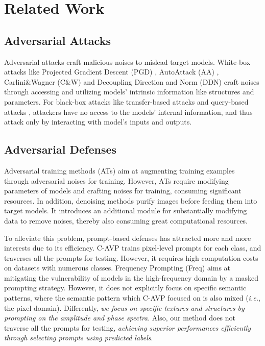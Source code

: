 \section{Related Work}
\subsection{Adversarial Attacks}
Adversarial attacks craft malicious noises to mislead target models. White-box attacks like Projected Gradient Descent (PGD) \cite{madry2017towards}, AutoAttack (AA) \cite{croce2020reliable}, Carlini\&Wagner (C\&W) \cite{carlini2017towards} and Decoupling Direction and Norm (DDN) \cite{rony2019decoupling} craft noises through accessing and utilizing models' intrinsic information like structures and parameters. For black-box attacks like transfer-based attacks and query-based attacks \cite{andriushchenko2020square}, attackers have no access to the models' internal information, and thus attack only by interacting with model's inputs and outputs.

\subsection{Adversarial Defenses}
Adversarial training methods (ATs) \cite{madry2017towards,zhang2019theoretically,wang2019improving} aim at augmenting training examples through adversarial noises for training. However, ATs require modifying parameters of models and crafting noises for training, consuming significant resources. In addition, denoising methods \cite{jin2019ape,zhou2023eliminating} purify images before feeding them into target models. It introduces an additional module for substantially modifying data to remove noises, thereby also consuming great computational resources.

To alleviate this problem, prompt-based defenses has attracted more and more interests due to its efficiency. C-AVP \cite{chen2023visual} trains pixel-level prompts for each class, and traverses all the prompts for testing. However, it requires high computation costs on datasets with numerous classes. Frequency Prompting (Freq) \cite{huang2023improving} aims at mitigating the vulnerability of models in the high-frequency domain by a masked prompting strategy. However, it does not explicitly focus on specific semantic patterns, where the semantic pattern which C-AVP focused on is also mixed (\textit{i.e.}, the pixel domain). Differently, \textit{we focus on specific textures and structures by prompting on the amplitude and phase spectra}. Also, our method does not traverse all the prompts for testing, \textit{achieving superior performances efficiently through selecting prompts using predicted labels}.
